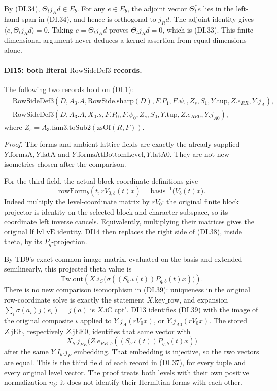 By (DI.34), \(\Theta_tj_Rd\in E_b\). For any \(e\in E_b\),
the adjoint vector \(\Theta_t^*e\) lies in the left-hand span in
(DI.34), and hence is orthogonal to \(j_Rd\). The adjoint identity
gives \(\langle e,\Theta_tj_Rd\rangle=0\). Taking
\(e=\Theta_tj_Rd\) proves \(\Theta_tj_Rd=0\), which is (DI.33).
This finite-dimensional argument never deduces a kernel assertion
from equal dimensions alone.

\paragraph{DI15: both literal \(\mathrm{RowSideDef3}\) records.}
\label{claim:DI15}
The following two records hold on (DI.1):
\[
\begin{split}
 &\mathrm{RowSideDef3}(D,A_3.A,\mathrm{RowSide.sharp}(D),
             F.P_1,F.\psi_1,Z_s,S_1,Y.\mathrm{tup},Z.e_{RR},Y.j_A),\\
 &\mathrm{RowSideDef3}(D,A_3.A,X_0.s,
             F.P_0,F.\psi_0,Z_s,S_0,Y.\mathrm{tup},Z.e_{RR0},Y.j_{A0}),
\end{split}
 \tag{DI.37}
\]
where \(Z_s=A_3.\mathrm{fam3.toSub2}(\mathrm{zsOf}(R,F))\).

\emph{Proof.}
The forms and ambient-lattice fields are exactly the already supplied
\(Y.\mathrm{formsA},Y.\mathrm{latA}\) and
\(Y.\mathrm{formsAtBottomLevel},Y.\mathrm{latA0}\). They are not
new isometries chosen after the comparison.

For the third field, the actual block-coordinate definitions give
\[
 \mathrm{rowForm}_b(t,rV_{0,b}(t)x)
             =\mathrm{basis}^{-1}\bigl(V_b(t)x\bigr).
 \tag{DI.38}
\]
Indeed multiply the level-coordinate matrix by \(rV_0\): the
original finite block projector is identity on the selected block
and character subspace, so its coordinate left inverse cancels.
Equivalently, multiplying their matrices gives the original
\(\mathrm{lf\_lvl\_vE}\) identity. DI14 then replaces the right
side of (DI.38), inside theta, by its \(P_q\)-projection.

By TD9's exact common-image matrix, evaluated on the basis and
extended semilinearly, this projected theta value is
\[
 \mathrm{Tw.out}\left(
     X.i_C\bigl(\sigma((S_b.\iota(t))P_{q,b}(t)x)\bigr)\right).
 \tag{DI.39}
\]
There is no new comparison isomorphism in (DI.39): uniqueness in
the original row-coordinate solve is exactly the statement
\(X.\mathrm{key\_row}\), and expansion
\(\sum_i\sigma(a_i)j(e_i)=j(a)\) is
\(X.\mathrm{iC\_cpt'}\).
DI13 identifies (DI.39) with the image of the original composite
\(\iota\) applied to \(Y.j_A(rV_0x)\), or \(Y.j_{A0}(rV_0x)\).
The stored \(Z.\mathrm{jEE}\), respectively
\(Z.\mathrm{jEE0}\), identifies that same vector with
\[
        X_b.j_{EE}\bigl(Z.e_{RR,b}((S_b.\iota(t))P_{q,b}(t)x)\bigr)
\]
after the same \(Y.I_b.j_E\) embedding. That embedding is injective,
so the two vectors are equal. This is the third field of each
record in (DI.37), for every tuple and every original level vector.
The proof treats both levels with their own positive normalization
\(n_b\); it does not identify their Hermitian forms with each other.

